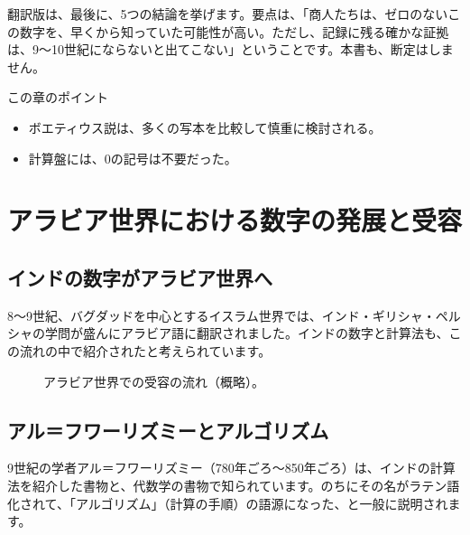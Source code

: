 \documentclass[a4paper,11pt,openany]{ltjsbook}
\begin{document}
翻訳版は、最後に、5つの結論を挙げます。要点は、「商人たちは、ゼロのないこの数字を、早くから知っていた可能性が高い。ただし、記録に残る確かな証拠は、9〜10世紀にならないと出てこない」ということです。本書も、断定はしません。

\begin{pointbox}{この章のポイント}
\begin{itemize}[leftmargin=1.5em]
\item ボエティウス説は、多くの写本を比較して慎重に検討される。
\item 計算盤には、0の記号は不要だった。
\end{itemize}
\end{pointbox}

\chapter{アラビア世界における数字の発展と受容}

\section{インドの数字がアラビア世界へ}

8〜9世紀、バグダッドを中心とするイスラム世界では、インド・ギリシャ・ペルシャの学問が盛んにアラビア語に翻訳されました。インドの数字と計算法も、この流れの中で紹介されたと考えられています。

\begin{figure}[htbp]
\centering
{}
\caption{アラビア世界での受容の流れ（概略）。}
\end{figure}

\section{アル＝フワーリズミーとアルゴリズム}

9世紀の学者アル＝フワーリズミー（780年ごろ〜850年ごろ）は、インドの計算法を紹介した書物と、代数学の書物で知られています。のちにその名がラテン語化されて、「アルゴリズム」（計算の手順）の語源になった、と一般に説明されます。
\end{document}
